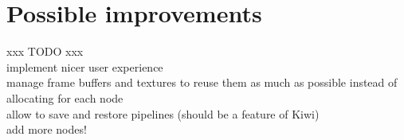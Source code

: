 
\section{Possible improvements}

xxx TODO xxx\\
implement nicer user experience\\
manage frame buffers and textures to reuse them as much as possible instead of allocating for each node\\
allow to save and restore pipelines (should be a feature of Kiwi)\\
add more nodes!\\
